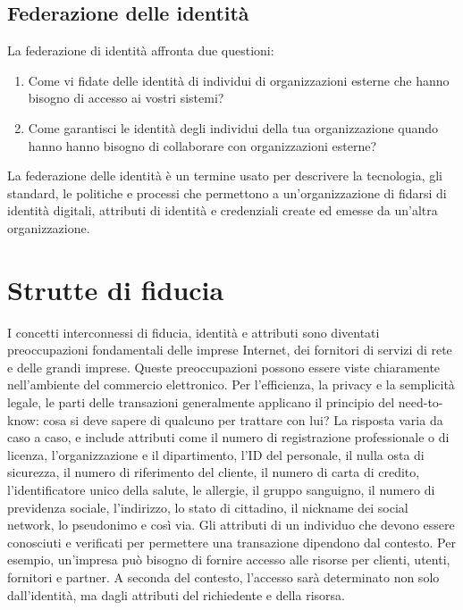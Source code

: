 \subsection{Federazione delle identità}
La federazione di identità affronta due questioni:
\begin{enumerate}
    \item Come vi fidate delle identità di individui di organizzazioni esterne che hanno bisogno di accesso ai vostri sistemi?
    
    \item Come garantisci le identità degli individui della tua organizzazione quando hanno hanno bisogno di collaborare con organizzazioni esterne?
\end{enumerate}
La federazione delle identità è un termine usato per descrivere la tecnologia, gli standard, le politiche e processi che permettono a un'organizzazione di fidarsi di identità digitali, attributi di identità e credenziali create ed emesse da un'altra organizzazione.
\section{Strutte di fiducia}
I concetti interconnessi di fiducia, identità e attributi sono diventati preoccupazioni fondamentali delle imprese Internet, dei fornitori di servizi di rete e delle grandi imprese. Queste preoccupazioni possono essere viste chiaramente nell'ambiente del commercio elettronico. Per l'efficienza, la privacy e la semplicità legale, le parti delle transazioni generalmente applicano il principio del need-to-know: cosa si deve sapere di qualcuno per trattare con lui? La risposta varia da caso a caso, e include attributi come il numero di registrazione professionale o di licenza, l'organizzazione e il dipartimento, l'ID del personale, il nulla osta di sicurezza, il numero di riferimento del cliente, il numero di carta di credito, l'identificatore unico della salute, le allergie, il gruppo sanguigno, il numero di previdenza sociale, l'indirizzo, lo stato di cittadino, il nickname dei social network, lo pseudonimo e così via. Gli attributi di un individuo che devono essere conosciuti e verificati per permettere una transazione dipendono dal contesto. Per esempio, un'impresa può bisogno di fornire accesso alle risorse per clienti, utenti, fornitori e partner. A seconda del contesto, l'accesso sarà determinato non solo dall'identità, ma dagli attributi del richiedente e della risorsa.
\newpage

